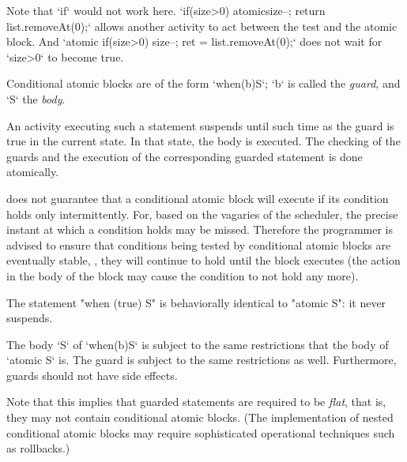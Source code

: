 Note that \xcd`if` would not work here.  
\xcd`if(size>0) atomic{size--; return list.removeAt(0);}` allows another
activity to act between the test and the atomic block.  
And 
\xcd`atomic{ if(size>0) {size--; ret = list.removeAt(0);}}` 
does not wait for \xcd`size>0` to become true.


Conditional atomic blocks are of the form \xcd`when(b)S`; 
\xcd`b` is called the {\em guard}, and \xcd`S` the {\em body}.

An activity executing such a statement suspends until such time as the  guard
is true in the current state. In that state, the 
body is executed. 
The checking of the guards and the execution of the corresponding
guarded statement is done atomically. 

\Xten{} does not guarantee that a conditional atomic block
will execute if its condition holds only intermittently. For, based on
the vagaries of the scheduler, the precise instant at which a
condition holds may be missed. Therefore the programmer is advised to
ensure that conditions being tested by conditional atomic blocks are
eventually stable, \ie, they will continue to hold until the block
executes (the action in the body of the block may cause the condition
to not hold any more).




The statement \xcd"when (true) S" is
behaviorally identical to \xcd"atomic S": it never suspends.

The body \xcd`S` of \xcd`when(b)S` is subject to the same restrictions that
the body of \xcd`atomic S` is.  The guard is subject to the same restrictions
as well.  Furthermore, guards should not have side effects.


Note that this implies that guarded statements are required to be {\em
flat}, that is, they may not contain conditional atomic blocks. (The
implementation of nested conditional atomic blocks may require
sophisticated operational techniques such as rollbacks.)


